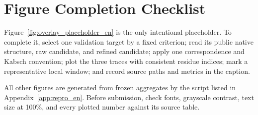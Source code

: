 \documentclass[12pt,a4paper,oneside]{report}
\begin{document}
\chapter{Figure Completion Checklist}

Figure~\ref{fig:overlay_placeholder_en} is the only intentional placeholder. To complete
it, select one validation target by a fixed criterion; read its public native structure,
raw candidate, and refined candidate; apply one correspondence and Kabsch convention;
plot the three traces with consistent residue indices; mark a representative local
window; and record source paths and metrics in the caption.

All other figures are generated from frozen aggregates by the script listed in
Appendix~\ref{app:repro_en}. Before submission, check fonts, grayscale contrast, text size
at 100\%, and every plotted number against its source table.


\end{document}
